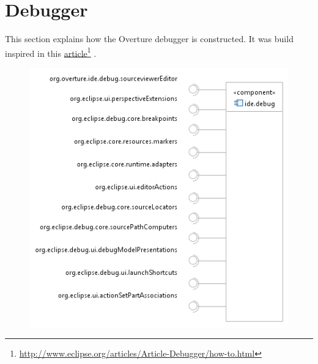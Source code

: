 \section{Debugger}

This section explains how the Overture debugger is constructed. It was build inspired in this \href{http://www.eclipse.org/articles/Article-Debugger/how-to.html}{article}\footnote{\url{http://www.eclipse.org/articles/Article-Debugger/how-to.html}} \cite{Wright&04}.

\begin{figure}[htp]
\centering
\includegraphics{figures/plugin_ide_debug}
\caption{}
\label{fig:}
\end{figure} 


